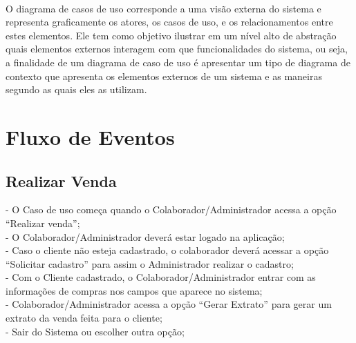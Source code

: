 \documentclass[a4paper]{article}
\begin{document}
    \\

      O diagrama de casos de uso corresponde a uma visão externa do sistema
      e representa graficamente os atores, os casos de uso, e os relacionamentos
      entre estes elementos. Ele tem como objetivo ilustrar em um nível alto de
      abstração quais elementos externos interagem com que funcionalidades do sistema,
      ou seja, a finalidade de um diagrama de caso de uso é apresentar um tipo de diagrama
      de contexto que apresenta os elementos externos de um sistema e as maneiras segundo
      as quais eles as utilizam.

 \section{Fluxo de Eventos}
    \subsection{Realizar Venda}
    - O Caso de uso começa quando o Colaborador/Administrador acessa a opção “Realizar venda”;\\
    - O Colaborador/Administrador deverá estar logado na aplicação;\\
    - Caso o cliente não esteja cadastrado, o colaborador deverá acessar a opção
    “Solicitar cadastro” para assim o Administrador realizar o cadastro;\\
    - Com o Cliente cadastrado, o Colaborador/Administrador entrar com as
    informações de compras nos campos que aparece no sistema;\\
    - Colaborador/Administrador acessa a opção “Gerar Extrato” para gerar um
    extrato da venda feita para o cliente;\\
    - Sair do Sistema ou escolher outra opção;\\
\end{document}
